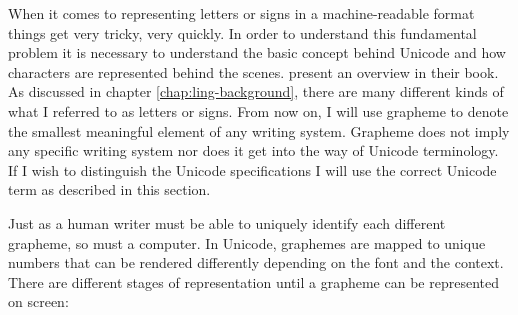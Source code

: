 When it comes to representing letters or signs in a machine-readable format things get very tricky, very quickly. In order to understand this fundamental problem it is necessary to understand the basic concept behind Unicode and how characters are represented behind the scenes. \citet{unicode-lingu} present an overview in their book. As discussed in chapter \ref{chap:ling-background}, there are many different kinds of what I referred to as letters or signs. From now on, I will use grapheme to denote the smallest meaningful element of any writing system. Grapheme does not imply any specific writing system nor does it get into the way of Unicode terminology. If I wish to distinguish the Unicode specifications I will use the correct Unicode term as described in this section. 

Just as a human writer must be able to uniquely identify each different grapheme, so must a computer. In Unicode, graphemes are mapped to unique numbers that can be rendered differently depending on the font and the context. There are different stages of representation until a grapheme can be represented on screen:

